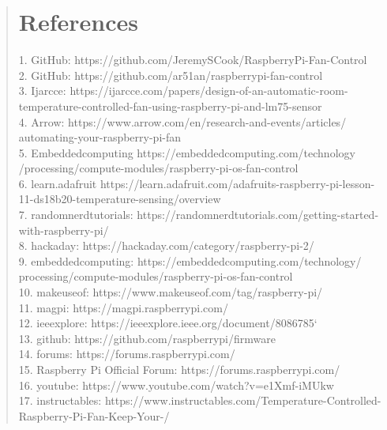 \documentclass[12pt]{report}
\begin{document}
	\begin{quote}
		\section{References}
		\justifying
		
		\begin{justifying}
			
			1. GitHub: https://github.com/JeremySCook/RaspberryPi-Fan-Control\\
			2. GitHub: https://github.com/ar51an/raspberrypi-fan-control\\
			3. Ijarcce: https://ijarcce.com/papers/design-of-an-automatic-room-temperature-controlled-fan-using-raspberry-pi-and-lm75-sensor\\
			4. Arrow: https://www.arrow.com/en/research-and-events/articles/\\automating-your-raspberry-pi-fan\\
			5. Embeddedcomputing https://embeddedcomputing.com/technology\\/processing/compute-modules/raspberry-pi-os-fan-control\\
			6. learn.adafruit https://learn.adafruit.com/adafruits-raspberry-pi-lesson-11-ds18b20-temperature-sensing/overview\\
			7. randomnerdtutorials: https://randomnerdtutorials.com/getting-started-with-raspberry-pi/\\
			8. hackaday: https://hackaday.com/category/raspberry-pi-2/\\
			9. embeddedcomputing: https://embeddedcomputing.com/technology/\\processing/compute-modules/raspberry-pi-os-fan-control\\
			10. makeuseof: https://www.makeuseof.com/tag/raspberry-pi/\\
			11. magpi: https://magpi.raspberrypi.com/\\
			12. ieeexplore: https://ieeexplore.ieee.org/document/8086785`\\
			13. github: https://github.com/raspberrypi/firmware\\
			14. forums: https://forums.raspberrypi.com/\\
			15. Raspberry Pi Official Forum: https://forums.raspberrypi.com/\\
			16. youtube: https://www.youtube.com/watch?v=e1Xmf-iMUkw\\
			17. instructables: https://www.instructables.com/Temperature-Controlled-Raspberry-Pi-Fan-Keep-Your-/\\

\end{justifying}
\end{quote}
\end{document}
